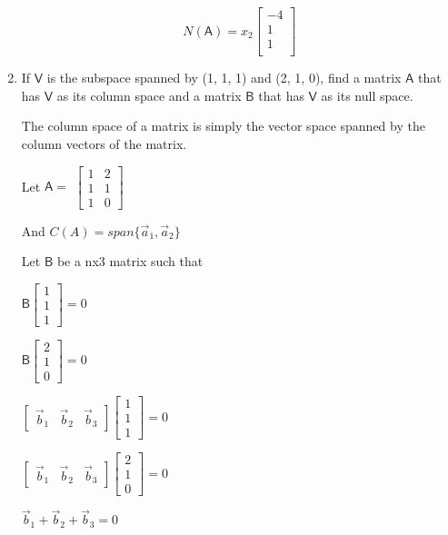 \documentclass[a4paper, 11pt]{article}
\newcommand{\mat}[1]{\boldsymbol { \mathsf{#1}} }
\begin{document}
\begin{enumerate}
\begin{equation*}
    N(\mat{A}) = x_2 
    \begin{bmatrix}
    -4 \\
    1 \\
    1 \\
    \end{bmatrix}
\end{equation*}

\item If $\mat V$ is the subspace spanned by (1, 1, 1) and (2, 1, 0), find a matrix $\mat A$ that has $\mat V$ as its column space and a matrix $\mat B$ that has $\mat V$ as its null space.

The column space of a matrix is simply the vector space spanned  by the column vectors of the matrix.

Let $\mat A = $
$
\begin{bmatrix}
1 & 2 \\
1 & 1 \\
1 & 0
\end{bmatrix}
$
 
And $C(A) = span\{\vec a_1, \vec a_2\}$
 
 Let $\mat B$ be a nx3 matrix such that 
  
$\mat B \begin{bmatrix}1 \\ 1 \\ 1\end{bmatrix} = 0$

$\mat B \begin{bmatrix}2 \\ 1 \\ 0\end{bmatrix} = 0$
 
$\begin{bmatrix} \vec b_1 & \vec b_2 & \vec b_3 \end{bmatrix} \begin{bmatrix}1 \\ 1 \\ 1\end{bmatrix} = 0$

$\begin{bmatrix} \vec b_1 & \vec b_2 & \vec b_3 \end{bmatrix} \begin{bmatrix}2 \\ 1 \\ 0\end{bmatrix} = 0$
 
$\vec b_1 + \vec b_2 + \vec b_3 = 0$


\end{enumerate}
\end{document}
